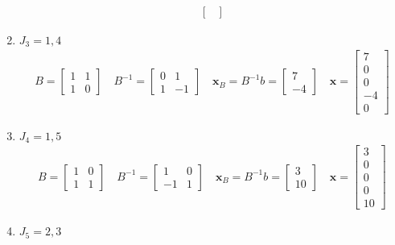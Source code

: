 \documentclass[11pt]{article}
\begin{document}
\begin{enumerate}
\begin{align*}
\begin{bmatrix}
        \end{bmatrix}
      \end{align*}
    \item $J_{3} = 1,4$
    \begin{align*}
        B = 
        \begin{bmatrix}
          1 & 1 \\ 1 & 0
        \end{bmatrix}
        \quad
        B^{-1} =
        \begin{bmatrix}
          0 & 1 \\ 1 & -1
        \end{bmatrix}
        \quad 
        \textbf{x}_{B} = B^{-1} b = 
        \begin{bmatrix}
          7 \\ -4
        \end{bmatrix}
        \quad
        \textbf{x} =
        \begin{bmatrix}
          7 \\ 0 \\ 0 \\ -4 \\ 0
        \end{bmatrix}
      \end{align*}
    \item $J_{4} = 1,5$
    \begin{align*}
        B = 
        \begin{bmatrix}
          1 & 0 \\ 1 & 1
        \end{bmatrix}
        \quad
        B^{-1} =
        \begin{bmatrix}
          1 & 0 \\ -1 & 1
        \end{bmatrix}
        \quad 
        \textbf{x}_{B} = B^{-1} b = 
        \begin{bmatrix}
          3 \\ 10
        \end{bmatrix}
        \quad
        \textbf{x} =
        \begin{bmatrix}
          3 \\ 0 \\ 0 \\ 0 \\ 10
        \end{bmatrix}
      \end{align*}
    \item $J_{5} = 2,3$
    \begin{align*}

\end{align*}
\end{enumerate}
\end{document}
